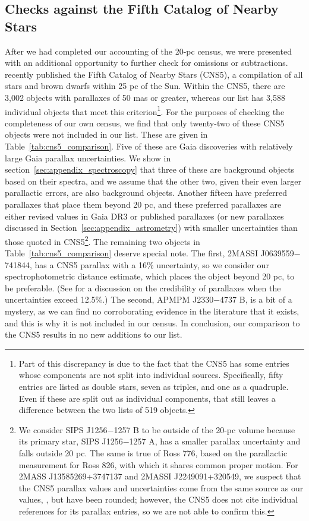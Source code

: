 \documentclass[twocolumn,tighten,twocolappendix]{aastex631}
\begin{document}
\subsection{Checks against the Fifth Catalog of Nearby Stars}

After we had completed our accounting of the 20-pc census, we were presented with an additional opportunity to further check for omissions or subtractions. \cite{golovin2022} recently published the Fifth Catalog of Nearby Stars (CNS5), a compilation of all stars and brown dwarfs within 25 pc of the Sun. Within the CNS5, there are 3,002 objects with parallaxes of 50 mas or greater, whereas our list has 3,588 individual objects that meet this criterion\footnote{Part of this discrepancy is due to the fact that the CNS5 has some entries whose components are not split into individual sources. Specifically, fifty entries are listed as double stars, seven as triples, and one as a quadruple. Even if these are split out as individual components, that still leaves a difference between the two lists of 519 objects.}. For the purposes of checking the completeness of our own census, we find that only twenty-two of these CNS5 objects were not included in our list. These are given in Table~\ref{tab:cns5_comparison}. Five of these are Gaia discoveries with relatively large Gaia parallax uncertainties. We show in section~\ref{sec:appendix_spectroscopy} that three of these are background objects based on their spectra, and we assume that the other two, given their even larger parallactic errors, are also background objects. Another fifteen have preferred parallaxes that place them beyond 20 pc, and these preferred parallaxes are either revised values in Gaia DR3 or published parallaxes (or new parallaxes discussed in Section~\ref{sec:appendix_astrometry}) with smaller uncertainties than those quoted in CNS5\footnote{We consider SIPS J1256$-$1257 B to be outside of the 20-pc volume because its primary star, SIPS J1256$-$1257 A, has a smaller parallax uncertainty and falls outside 20 pc. The same is true of Ross 776, based on the parallactic measurement for Ross 826, with which it shares common proper motion. For 2MASS J13585269+3747137 and 2MASSI J2249091+320549, we suspect that the CNS5 parallax values and uncertainties come from the same source as our values, \cite{best2020}, but have been rounded; however, the CNS5 does not cite individual references for its parallax entries, so we are not able to confirm this.}. The remaining two objects in Table~\ref{tab:cns5_comparison} deserve special note. The first, 2MASSI J0639559$-$741844, has a CNS5 parallax with a 16\% uncertainty, so we consider our spectrophotometric distance estimate, which places the object beyond 20 pc, to be preferable. (See \citealt{kirkpatrick2021} for a discussion on the credibility of parallaxes when the uncertainties exceed 12.5\%.) The second, APMPM J2330$-$4737 B, is a bit of a mystery, as we can find no corroborating evidence in the literature that it exists, and this is why it is not included in our census. In conclusion, our comparison to the CNS5 results in no new additions to our list.
\end{document}
